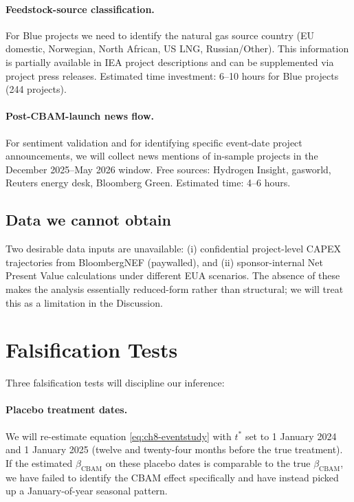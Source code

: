 \documentclass[11pt,a4paper]{article}
\newcommand{\bcbam}{\beta_{\mathrm{CBAM}}}
\begin{document}
\paragraph{Feedstock-source classification.} For Blue projects we need to identify the natural gas source country (EU domestic, Norwegian, North African, US LNG, Russian/Other). This information is partially available in IEA project descriptions and can be supplemented via project press releases. Estimated time investment: 6--10 hours for Blue projects (244 projects).

\paragraph{Post-CBAM-launch news flow.} For sentiment validation and for identifying specific event-date project announcements, we will collect news mentions of in-sample projects in the December 2025--May 2026 window. Free sources: Hydrogen Insight, gasworld, Reuters energy desk, Bloomberg Green. Estimated time: 4--6 hours.

\subsection{Data we cannot obtain}

Two desirable data inputs are unavailable: (i) confidential project-level CAPEX trajectories from BloombergNEF (paywalled), and (ii) sponsor-internal Net Present Value calculations under different EUA scenarios. The absence of these makes the analysis essentially reduced-form rather than structural; we will treat this as a limitation in the Discussion.

\section{Falsification Tests}
\label{sec:ch8-falsification}

Three falsification tests will discipline our inference:

\paragraph{Placebo treatment dates.} We will re-estimate equation \eqref{eq:ch8-eventstudy} with $t^*$ set to 1 January 2024 and 1 January 2025 (twelve and twenty-four months before the true treatment). If the estimated $\bcbam$ on these placebo dates is comparable to the true $\bcbam$, we have failed to identify the CBAM effect specifically and have instead picked up a January-of-year seasonal pattern.
\end{document}
